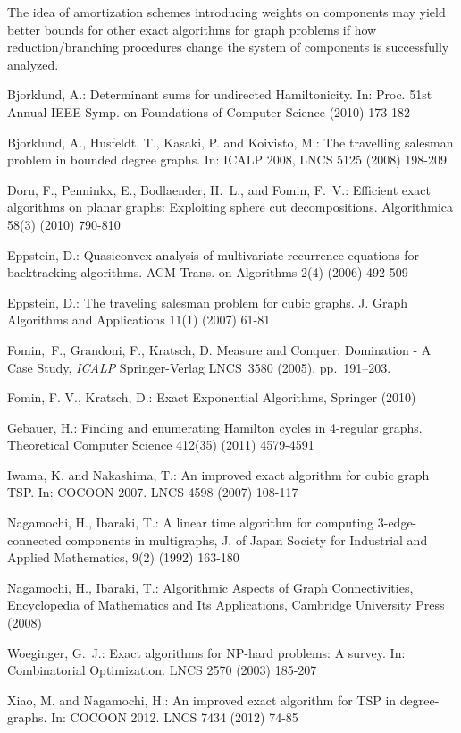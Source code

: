 \documentclass[runningheads]{llncs}
\begin{document}
The idea of amortization schemes introducing weights on
components may yield better bounds for other exact algorithms
for graph problems if
how reduction/branching procedures change the system of
components  is successfully analyzed.


\begin{thebibliography}{99}


Bjorklund, A.:
\newblock Determinant sums for undirected Hamiltonicity.
\newblock In: Proc. 51st Annual IEEE Symp. on Foundations of Computer Science (2010)  173-182

Bjorklund, A., Husfeldt, T., Kasaki, P. and Koivisto, M.:
\newblock The travelling salesman problem in bounded degree graphs.
\newblock In: ICALP 2008, LNCS 5125 (2008) 198-209


Dorn, F., Penninkx, E., Bodlaender, H.~L., and Fomin, F.~V.:
\newblock Efficient exact algorithms on planar graphs: Exploiting sphere cut decompositions.
\newblock Algorithmica  58(3) (2010)  790-810

Eppstein, D.:
Quasiconvex analysis of multivariate recurrence equations
for backtracking algorithms.
ACM Trans. on Algorithms  2(4) (2006) 492-509

Eppstein, D.:
\newblock The traveling salesman problem for cubic graphs.
\newblock J. Graph Algorithms and Applications 11(1) (2007)  61-81

Fomin,~F., Grandoni, F., Kratsch, D.
Measure and Conquer: Domination - A Case Study,
{\em ICALP\/} Springer-Verlag LNCS~3580 (2005),
pp.~191--203.

Fomin, F. V.,  Kratsch, D.:
Exact Exponential Algorithms, Springer (2010)

Gebauer, H.:
\newblock Finding and enumerating Hamilton cycles in 4-regular graphs.
\newblock Theoretical Computer Science  412(35) (2011)  4579-4591

Iwama, K. and Nakashima, T.:
\newblock An improved exact algorithm for cubic graph TSP.
\newblock In: COCOON 2007.
LNCS  4598
(2007) 108-117


 Nagamochi, H., Ibaraki, T.:
A linear time algorithm for computing 3-edge-connected
 components in multigraphs,
 { J. of Japan Society for Industrial and Applied Mathematics},
 9(2) (1992) 163-180

 Nagamochi, H., Ibaraki, T.:
 Algorithmic Aspects of Graph Connectivities, Encyclopedia of Mathematics and Its Applications, Cambridge University Press (2008)

Woeginger, G.~J.:
\newblock  Exact algorithms for NP-hard problems: A survey.
\newblock In: Combinatorial Optimization. LNCS 2570 (2003)  185-207


  Xiao, M. and  Nagamochi, H.:
\newblock  An improved exact algorithm for TSP in degree- graphs.
\newblock In: COCOON 2012.
LNCS 7434 (2012) 74-85

\end{thebibliography}
\end{document}
